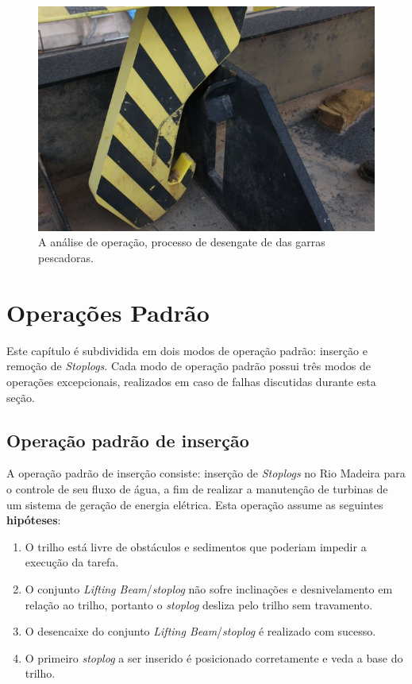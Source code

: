 \begin{figure}[h!]
    \centering \includegraphics[width=0.6\columnwidth]{figs/jirau/jirau_22}
    \caption{A análise de operação, processo de desengate de das garras pescadoras.}
    \label{fig:jirau22}
\end{figure}



\clearpage

\chapter{Operações Padrão}
Este capítulo é subdividida em dois modos de operação padrão: inserção e remoção
de \emph{Stoplogs}. Cada modo de operação padrão possui três modos de operações
excepcionais, realizados em caso de falhas discutidas durante esta seção.



\section{Operação padrão de inserção}
A operação padrão de inserção consiste: inserção de \emph{Stoplogs} no Rio
Madeira para o controle de seu fluxo de água, a fim de realizar a manutenção de
turbinas de um sistema de geração de energia elétrica. Esta operação assume as
seguintes \textbf{hipóteses}:
\begin{enumerate}
\item O trilho está livre de obstáculos e sedimentos que poderiam impedir a execução da tarefa.
\label{hip:ins:1}
\item O conjunto \emph{ Lifting Beam}/\emph{stoplog } não sofre inclinações e
desnivelamento em relação ao trilho, portanto o \emph{stoplog} desliza pelo
trilho sem travamento. \label{hip:ins:2}
\item O desencaixe do conjunto \emph{Lifting Beam}/\emph{stoplog} é realizado
com sucesso. \label{hip:ins:3}
\item O primeiro \emph{stoplog} a ser inserido é posicionado corretamente e veda a base do trilho.
\label{hip:ins:4}
\end{enumerate}

